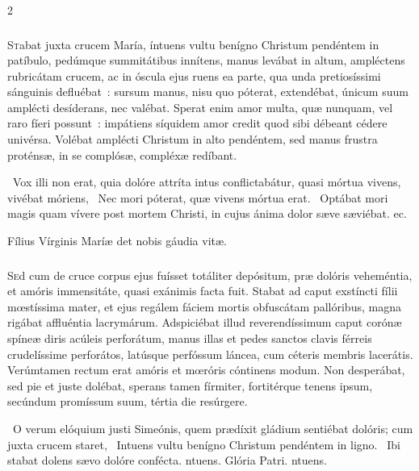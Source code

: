 \documentclass[9pt,twoside]{extarticle}
\begin{document}
\begin{multicols}{2}
\subsubsection*{\center {}}
\lettrine{S}tabat juxta crucem María, íntuens vultu benígno Christum pendéntem in patíbulo, pedúmque summitátibus innítens, manus levábat in altum, ampléctens rubricátam crucem, ac in óscula ejus ruens ea parte, qua unda pretiosíssimi sánguinis defluébat~: sursum manus, nisu quo póterat, extendébat, únicum suum amplécti desíderans, nec valébat. Sperat enim amor multa, quæ nunquam, vel raro fíeri possunt~: impátiens síquidem amor credit quod sibi débeant cédere univérsa. Volébat amplécti Christum in alto pendéntem, sed manus frustra proténsæ, in se complósæ, compléxæ redíbant.

\begin{tightlist}{}
\item {}~Vox illi non erat, quia dolóre attríta intus conflictabátur, quasi mórtua vivens, vivébat móriens, \textred{*}~Nec mori póterat, quæ vivens mórtua erat. ~Optábat mori magis quam vívere post mortem Christi, in cujus ánima dolor sæve sæviébat. ec.
\item {\small {} Fílius Vírginis Maríæ det nobis gáudia vitæ.}
\end{tightlist}

\subsubsection*{\center {}}
\lettrine{S}ed cum de cruce corpus ejus fuísset totáliter depósitum, præ dolóris veheméntia, et amóris immensitáte, quasi exánimis facta fuit. Stabat ad caput exstíncti fílii mœstíssima mater, et ejus regálem fáciem mortis obfuscátam pallóribus, magna rigábat affluéntia lacrymárum. Adspiciébat illud reverendíssimum caput corónæ spíneæ diris acúleis perforátum, manus illas et pedes sanctos clavis férreis crudelíssime perforátos, latúsque perfóssum láncea, cum céteris membris lacerátis. Verúmtamen rectum erat amóris et mœróris cóntinens modum. Non desperábat, sed pie et juste dolébat, sperans tamen fírmiter, fortitérque tenens ipsum, secúndum promíssum suum, tértia die resúrgere.

\begin{tightlist}{}
\item {}~O verum elóquium justi Simeónis, quem prædíxit gládium sentiébat dolóris; cum juxta crucem staret, \textred{*}~Intuens vultu benígno Christum pendéntem in ligno. ~Ibi stabat dolens sævo dolóre confécta. ntuens. Glória Patri. ntuens.
\end{tightlist}


\end{multicols}
\end{document}
